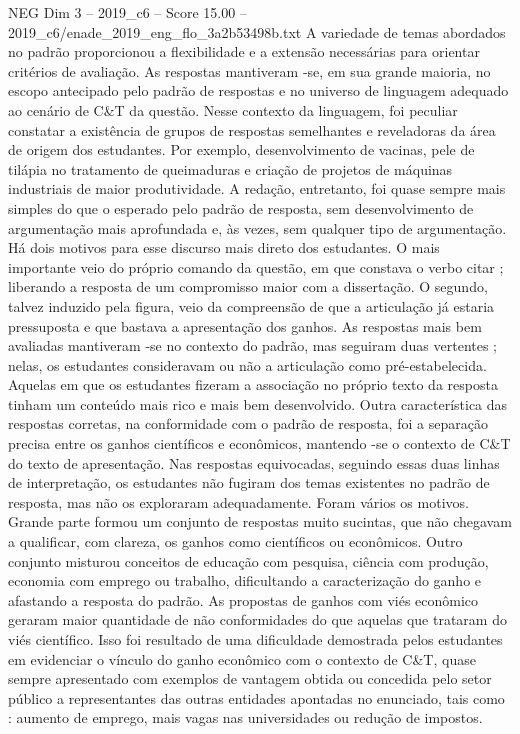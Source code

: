 \begin{textsample}{NEG Dim 3 – 2019\_c6 – Score 15.00 – 2019\_c6/enade\_2019\_eng\_flo\_3a2b53498b.txt}
A variedade de temas abordados no padrão proporcionou a flexibilidade e a extensão necessárias para orientar critérios de avaliação.
As respostas mantiveram -se, em sua grande maioria, no escopo antecipado pelo padrão de respostas e no universo de linguagem adequado ao cenário de C\&T da questão.
Nesse contexto da linguagem, foi peculiar constatar a existência de grupos de respostas semelhantes e reveladoras da área de origem dos estudantes.
Por exemplo, desenvolvimento de vacinas, pele de tilápia no tratamento de queimaduras e criação de projetos de máquinas industriais de maior produtividade.
A redação, entretanto, foi quase sempre mais simples do que o esperado pelo padrão de resposta, sem desenvolvimento de argumentação mais aprofundada e, às vezes, sem qualquer tipo de argumentação.
Há dois motivos para esse discurso mais direto dos estudantes.
O mais importante veio do próprio comando da questão, em que constava o verbo citar ; liberando a resposta de um compromisso maior com a dissertação.
O segundo, talvez induzido pela figura, veio da compreensão de que a articulação já estaria pressuposta e que bastava a apresentação dos ganhos.
As respostas mais bem avaliadas mantiveram -se no contexto do padrão, mas seguiram duas vertentes ; nelas, os estudantes consideravam ou não a articulação como pré-estabelecida.
Aquelas em que os estudantes fizeram a associação no próprio texto da resposta tinham um conteúdo mais rico e mais bem desenvolvido.
Outra característica das respostas corretas, na conformidade com o padrão de resposta, foi a separação precisa entre os ganhos científicos e econômicos, mantendo -se o contexto de C\&T do texto de apresentação.
Nas respostas equivocadas, seguindo essas duas linhas de interpretação, os estudantes não fugiram dos temas existentes no padrão de resposta, mas não os exploraram adequadamente.
Foram vários os motivos.
Grande parte formou um conjunto de respostas muito sucintas, que não chegavam a qualificar, com clareza, os ganhos como científicos ou econômicos.
Outro conjunto misturou conceitos de educação com pesquisa, ciência com produção, economia com emprego ou trabalho, dificultando a caracterização do ganho e afastando a resposta do padrão.
As propostas de ganhos com viés econômico geraram maior quantidade de não conformidades do que aquelas que trataram do viés científico.
Isso foi resultado de uma dificuldade demostrada pelos estudantes em evidenciar o vínculo do ganho econômico com o contexto de C\&T, quase sempre apresentado com exemplos de vantagem obtida ou concedida pelo setor público a representantes das outras entidades apontadas no enunciado, tais como : aumento de emprego, mais vagas nas universidades ou redução de impostos.

\end{textsample}
